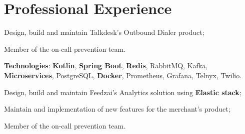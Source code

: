 \documentclass[letterpaper]{deedy-resume} %
\begin{document}
%
\begin{minipage}[t]{0.64\textwidth} %


\section{Professional Experience}
\vspace{0.5mm}

\vspace{4.0mm}
\begin{tightitemize}
	\item Design, build and maintain Talkdesk's Outbound Dialer product;
	\item Member of the on-call prevention team.
\end{tightitemize}

\vspace{0.75mm}

\textbf{Technologies}: \textbf{Kotlin}, \textbf{Spring Boot}, \textbf{Redis}, RabbitMQ, Kafka, \textbf{Microservices}, PostgreSQL, \textbf{Docker}, Prometheus, Grafana, Telnyx, Twilio.


\vspace{4.5mm}



\vspace{0.5mm}
\begin{tightitemize}
	\item Design, build and maintain Feedzai's Analytics solution using \textbf{Elastic stack};
	\item Maintain and implementation of new features for the merchant's product;
	\item Member of the on-call prevention team.
\end{tightitemize}


\end{minipage}
\end{document}
